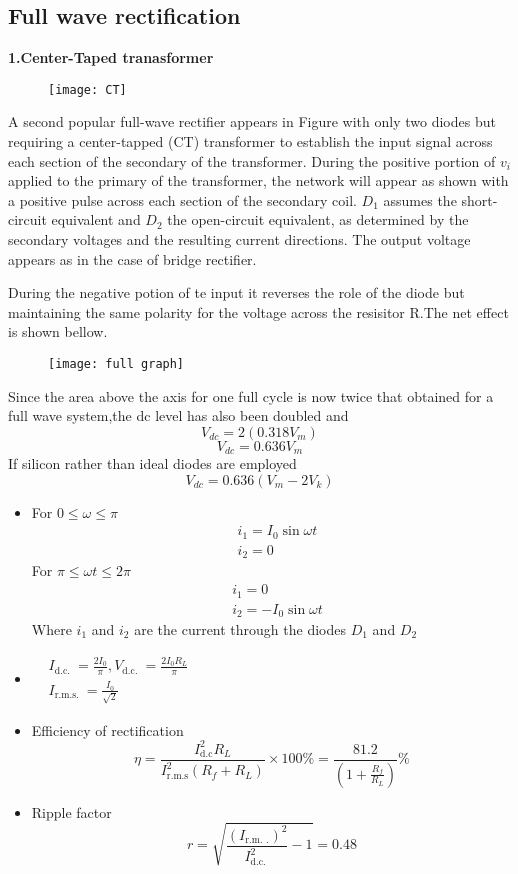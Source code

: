 \subsection{Full wave rectification} 

\textbf{1.Center-Taped tranasformer}
\begin{figure}[H]
\centering
\texttt{[image: CT]}
\caption{}
\label{}
\end{figure}
A second popular full-wave rectifier appears in Figure with only two diodes but requiring a center-tapped (CT) transformer to establish the input signal across each section of the secondary of the transformer. During the positive portion of $v_{i}$ applied to the primary of the transformer, the network will appear as shown  with a positive pulse across each section of the secondary coil. $D_{1}$ assumes the short-circuit equivalent and $D_{2}$ the open-circuit equivalent, as determined by the secondary voltages and the resulting current directions. The output voltage appears as in the case of bridge rectifier.
\par During the negative potion of te input it reverses the role of the diode but maintaining the same polarity for the voltage across the resisitor R.The net effect is shown bellow.
\begin{figure}[H]
\centering
\texttt{[image: full graph]}
\caption{}
\label{}
\end{figure}
Since the area above the axis for one full cycle is now twice that obtained for a full wave system,the dc level has also been doubled and 
$$V_{dc}=2 (0.318V_m)$$
$$V_{dc}=0.636V_m$$
If silicon rather than ideal diodes are employed 
$$V_{dc}=0.636(V_m-2V_k)$$
\begin{note}
\begin{itemize}
	\item For $0\leq \omega \leq \pi$
	$$\begin{aligned}
	&i_{1}=I_{0} \sin \omega t \\
	&i_{2}=0
	\end{aligned}
	$$
	For $\pi \leq\omega t\leq 2\pi$
	$$\begin{aligned}
	&i_{1}=0 \\
	&i_{2}=-I_{0} \sin \omega t
	\end{aligned}$$
	Where $i_{1}$ and $i_{2}$ are the current through the diodes $D_{1}$ and $D_{2}$
	\item $\begin{aligned}
	&I_{\text {d.c. }}=\frac{2 I_{0}}{\pi}, V_{\text {d.c. }}=\frac{2 I_{0} R_{L}}{\pi} \\
	&I_{\text {r.m.s. }}=\frac{I_{0}}{\sqrt{2}}
	\end{aligned}$
	\item Efficiency of rectification 
	$$\eta=\frac{I_{\mathrm{d} . \mathrm{c}}^{2} R_{L}}{I_{\mathrm{r} . \mathrm{m} . \mathrm{s}}^{2}\left(R_{f}+R_{L}\right)} \times 100 \%=\frac{81.2}{\left(1+\frac{R_{f}}{R_{L}}\right)} \%$$
	\item Ripple factor
	$$r=\sqrt{\frac{\left(I_{\text {r.m. } .}\right)^{2}}{I_{\text {d.c. }}^{2}}-1}=0.48$$
\end{itemize}
\end{note}
